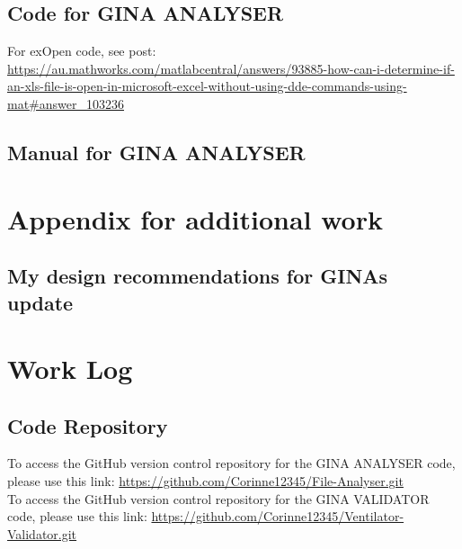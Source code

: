\documentclass[12pt, openany, oneside]{book}
\begin{document}
\section{Code for GINA ANALYSER}
\label{appendix:B}

%


%


%



For exOpen code, see post: \url{https://au.mathworks.com/matlabcentral/answers/93885-how-can-i-determine-if-an-xls-file-is-open-in-microsoft-excel-without-using-dde-commands-using-mat#answer_103236}

\section{Manual for GINA ANALYSER}
\label{appendix:GA}


\chapter{Appendix for additional work}
\label{appendix:C}
\section{My design recommendations for GINAs update}


\chapter{Work Log}
\section{Code Repository}
To access the GitHub version control repository for the GINA ANALYSER code, please use this link: \url{ https://github.com/Corinne12345/File-Analyser.git} \\
To access the GitHub version control repository for the GINA VALIDATOR code, please use this link: \url{https://github.com/Corinne12345/Ventilator-Validator.git} \\
\end{document}
